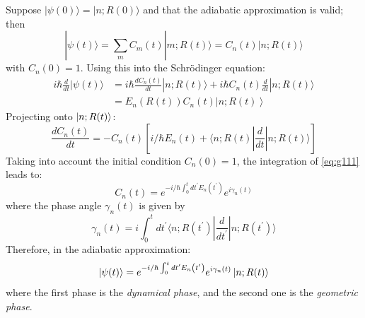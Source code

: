 \documentclass[12pt]{article}
\newcommand{\be}{\begin{equation}}
\newcommand{\ee}{\end{equation}}
\begin{document}
Suppose $|\psi(0)\rangle=|n ; R(0)\rangle$ and that the adiabatic
approximation is valid; then
\be
|\psi(t)\rangle=\sum_m C_{m}(t)|m ; R(t)\rangle=C_{n}(t)|n ; R(t)\rangle
\ee
with $C_n(0) = 1$.
Using this into the Schrödinger equation:
\be
\begin{aligned}
i \hbar \frac{d}{d t}|\psi(t)\rangle
&=i \hbar \frac{d C_{n}(t)}{d t}|n ; R(t)\rangle+i \hbar C_{n} (t) \frac{d}{d t}|n ; R(t)\rangle\\
&=E_{n}(R(t)) C_{n}(t)\left|n ; R(t)\right\rangle
\end{aligned}
\ee
Projecting onto $\ket{n;R(t)}$:
\be
\frac{d C_{n}(t)}{d t}=-C_{n}(t)
\left[i / \hbar E_{n}(t)+\langle n ; R(t)|\frac{d}{d t}|n ; R(t)\rangle\right]
\label{eq:g111} 
\ee
Taking into account the initial condition $C_{n}(0)=1$, the
integration of \eqref{eq:g111} leads to:
\be
C_{n}(t)=e^{-i / \hbar \int_{0}^{t} d t^{\prime} E_{n}\left(t^{\prime}\right)} e^{i \gamma_{n}(t)}
\ee
where the phase angle $\gamma_n(t)$ is given by
\be
\gamma_{n}(t)=i \int_{0}^{t} d t^{\prime}\langle n ; R(t^{\prime})|\frac{d}{d t^{\prime}}|n ; R(t^{\prime})\rangle
\ee
Therefore, in the adiabatic approximation:
\be
\ket{\psi(t)} = e^{-i / \hbar \int_{0}^{t} d t^{\prime} E_{n}\left(t^{\prime}\right)} e^{i \gamma_{n}(t)} \ket{n;R(t)}
\ee
where the first phase is the \emph{dynamical phase}, 
and the second one is the \emph{geometric phase}.
\end{document}
